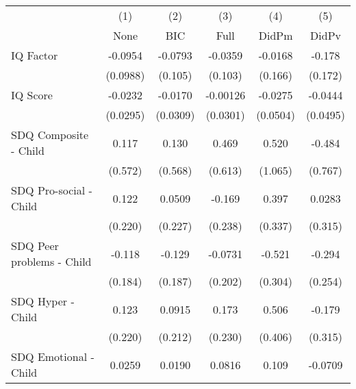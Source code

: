 {
\def\sym#1{\ifmmode^{#1}\else\(^{#1}\)\fi}
\begin{tabular}{l*{5}{c}}
\toprule
            &\multicolumn{1}{c}{(1)}&\multicolumn{1}{c}{(2)}&\multicolumn{1}{c}{(3)}&\multicolumn{1}{c}{(4)}&\multicolumn{1}{c}{(5)}\\
            &\multicolumn{1}{c}{None}&\multicolumn{1}{c}{BIC}&\multicolumn{1}{c}{Full}&\multicolumn{1}{c}{DidPm}&\multicolumn{1}{c}{DidPv}\\
\midrule
IQ Factor   &     -0.0954         &     -0.0793         &     -0.0359         &     -0.0168         &      -0.178         \\
            &    (0.0988)         &     (0.105)         &     (0.103)         &     (0.166)         &     (0.172)         \\
\addlinespace
IQ Score    &     -0.0232         &     -0.0170         &    -0.00126         &     -0.0275         &     -0.0444         \\
            &    (0.0295)         &    (0.0309)         &    (0.0301)         &    (0.0504)         &    (0.0495)         \\
\addlinespace
SDQ Composite - Child&       0.117         &       0.130         &       0.469         &       0.520         &      -0.484         \\
            &     (0.572)         &     (0.568)         &     (0.613)         &     (1.065)         &     (0.767)         \\
\addlinespace
SDQ Pro-social - Child&       0.122         &      0.0509         &      -0.169         &       0.397         &      0.0283         \\
            &     (0.220)         &     (0.227)         &     (0.238)         &     (0.337)         &     (0.315)         \\
\addlinespace
SDQ Peer problems - Child&      -0.118         &      -0.129         &     -0.0731         &      -0.521         &      -0.294         \\
            &     (0.184)         &     (0.187)         &     (0.202)         &     (0.304)         &     (0.254)         \\
\addlinespace
SDQ Hyper - Child&       0.123         &      0.0915         &       0.173         &       0.506         &      -0.179         \\
            &     (0.220)         &     (0.212)         &     (0.230)         &     (0.406)         &     (0.315)         \\
\addlinespace
SDQ Emotional - Child&      0.0259         &      0.0190         &      0.0816         &       0.109         &     -0.0709         \\

\end{tabular}}
